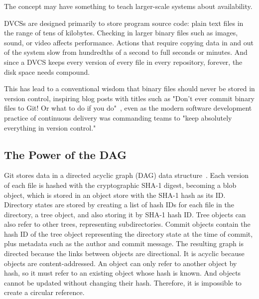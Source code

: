 The  concept may have something to
teach larger-scale systems about availability.


\Glspl{DVCS} are designed primarily to store program source code: plain text files in the range of tens of kilobytes.
Checking in larger binary files such as images, sound, or video affects performance.
Actions that require copying data in and out of the system slow from hundredths of a second to full seconds or minutes.
And since a \gls{DVCS} keeps every version of every file in every \gls{repository}, forever, the disk space needs compound.

This has lead to a conventional wisdom that binary files should never be stored in version control, inspiring blog posts with titles such as
"Don't ever commit binary files to Git! Or what to do if you do"~\cite{dont_ever_commit_binaries_to_version_control},
even as the modern software development practice of continuous delivery was commanding teams to "keep absolutely everything in version control."~\cite[p.33]{continuousdeliverybook}


\subsection{The Power of the DAG}

Git stores data in a directed acyclic graph (DAG) data structure~\cite{git_initial_readme}.
Each version of each file is hashed with the cryptographic SHA-1 digest, becoming a blob object, which is stored in an object store with the SHA-1 hash as its ID.
Directory states are stored by creating a list of hash IDs for each file in the directory, a tree object, and also storing it by SHA-1 hash ID.
Tree objects can also refer to other trees, representing subdirectories.
Commit objects contain the hash ID of the tree object representing the directory state at the time of commit, plus metadata such as the author and commit message.
The resulting graph is directed because the links between objects are directional.
It is acyclic because objects are content-addressed.
An object can only refer to another object by hash, so it must refer to an existing object whose hash is known.
And objects cannot be updated without changing their hash.
Therefore, it is impossible to create a circular reference.

